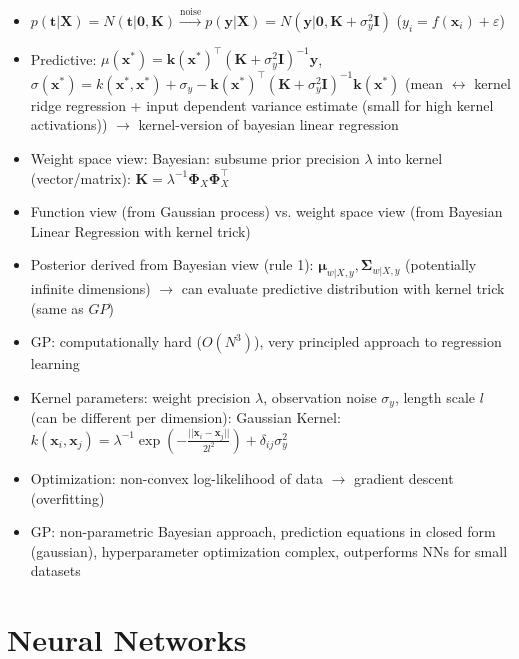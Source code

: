 \documentclass[11pt]{scrartcl}
\begin{document}
\begin{itemize}
    \item \( p ( \bm{t} | \bm{X} ) = N ( \bm{t} | \bm{0}, \bm{K} ) 
        \xrightarrow{\mathrm{noise}} p ( \bm{y} | \bm{X} ) = 
        N ( \bm{y} | \bm{0}, \bm{K} + \sigma_y^2 \bm{I} ) \) (\( y_i = 
        f ( \bm{x}_i ) + \varepsilon \))
    \item Predictive: \( \mu ( \bm{x}^* ) = 
        \bm{k} ( \bm{x}^* )^\top ( \bm{K} + \sigma_y^2 \bm{I} )^{- 1} \bm{y} \), 
        \( \sigma ( \bm{x}^* ) = k ( \bm{x}^*, \bm{x}^* ) + \sigma_y - 
        \bm{k} ( \bm{x}^* )^\top ( \bm{K} + \sigma_y^2 \bm{I} )^{- 1} \bm{k} ( \bm{x}^* ) \) 
        (mean \( \leftrightarrow \) kernel ridge regression + input dependent variance 
        estimate (small for high kernel activations)) \( \rightarrow \) kernel-version of 
        bayesian linear regression
    \item Weight space view: Bayesian: subsume prior precision \( \lambda \) into kernel (vector/matrix): 
        \( \bm{K} = \lambda^{- 1} \bm{\Phi}_X \bm{\Phi}_X^\top \)
    \item Function view (from Gaussian process) vs. weight space view (from Bayesian Linear 
        Regression with kernel trick)
    \item Posterior derived from Bayesian view (rule 1): \( \bm{\mu}_{w | X, y}, 
        \bm{\Sigma}_{w | X, y} \) (potentially infinite dimensions) \( \rightarrow \) can 
        evaluate predictive distribution with kernel trick (same as \( GP \))
    \item GP: computationally hard (\( O ( N^3 ) \)), very principled approach to regression 
        learning
    \item Kernel parameters: weight precision \( \lambda \), observation noise \( \sigma_y \), 
        length scale \( l \) (can be different per dimension): Gaussian Kernel: 
        \( k ( \bm{x}_i, \bm{x}_j ) = 
        \lambda^{- 1} \exp ( - \frac{|| \bm{x}_i - \bm{x}_j ||}{2 l^2} ) + 
        \delta_{ij} \sigma_y^2 \)
    \item Optimization: non-convex log-likelihood of data \( \rightarrow \) gradient descent 
        (overfitting)
    \item GP: non-parametric Bayesian approach, prediction equations in closed form 
        (gaussian), hyperparameter optimization complex, outperforms NNs for small datasets
\end{itemize}

\section{Neural Networks}
\end{document}
